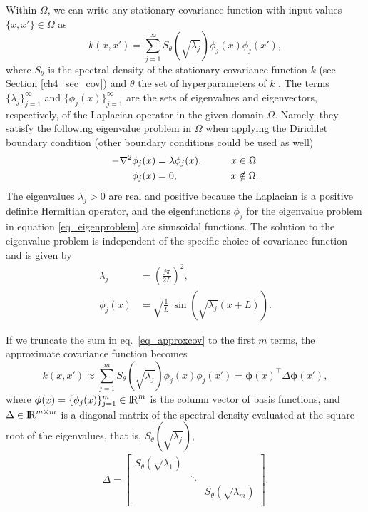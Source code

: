 \documentclass[onecolumn,a4paper,11pt]{article}
\begin{document}
Within $\Omega$, we can write any stationary covariance function with input values $\{x,x'\} \in \Omega$ as
%
\begin{equation}\label{eq_approxcov}
k(x,x') = \sum_{j=1}^\infty S_{\theta}(\sqrt{\lambda_j}) \phi_j(x) \phi_j(x'),
\end{equation} 
%
where $S_{\theta}$ is the spectral density of the stationary covariance function $k$ (see Section \ref{ch4_sec_cov}) and $\theta$ the set of hyperparameters of $k$ \citep{rasmussen2006gaussian}. The terms $\{\lambda_j\}_{j=1}^{\infty}$ and $\{\phi_j(x)\}_{j=1}^{\infty}$ are the sets of eigenvalues and eigenvectors, respectively, of the Laplacian operator in the given domain $\Omega$. Namely, they satisfy the following eigenvalue problem in $\Omega$ when applying the Dirichlet boundary condition (other boundary conditions could be used as well)
%
\begin{align}\label{eq_eigenproblem}
\begin{split}
-\nabla^2 \phi_j(x)&=\lambda \phi_j(x), \hspace{1cm}  x \in \Omega \\ 
\phi_j(x)&= 0, \hspace{1.85cm}   x \notin \Omega.
\end{split}
\end{align} 
%
The eigenvalues $\lambda_j>0$ are real and positive because the Laplacian is a positive definite Hermitian operator, and the eigenfunctions $\phi_j$ for the eigenvalue problem in equation \eqref{eq_eigenproblem} are sinusoidal functions. The solution to the eigenvalue problem is independent of  the specific choice of covariance function and is given by
%
\begin{align}
\lambda_j&=\left(\frac{j\pi}{2L}\right)^{\!2}, \label{eq_eigenvalue}\\
\phi_j(x)&=\sqrt{\frac{1}{L}}\, \sin\!\!\left(\sqrt{\lambda_j}(x+L)\right). \label{eq_eigenfunction}
\end{align}

If we truncate the sum in eq.~\eqref{eq_approxcov} to the first $m$ terms, the approximate covariance function becomes
%
\begin{equation}
k(x,x') \approx \sum_{j=1}^m S_{\theta}(\sqrt{\lambda_j}) \phi_j(x) \phi_j(x') = \bm{\phi}(x)^\intercal \Delta \bm{\phi}(x'), \nonumber
\end{equation}
%
where $\bm{\phi}(x)=\{\phi_j(x)\}_{j=1}^{m} \in {\rm I\!R}^{m}$ is the column vector of basis functions, and $\Delta  \in {\rm I\!R}^{m\times m}$ is a diagonal matrix of the spectral density evaluated at the square root of the eigenvalues, that is, $S_{\theta}(\sqrt{\lambda_j})$,
%
\begin{align}
\Delta =  \begin{bmatrix}
    S_{\theta}(\sqrt{\lambda_1}) & & \\
    & \ddots & \nonumber \\
    & & S_{\theta}(\sqrt{\lambda_m}) \\
  \end{bmatrix}.
\end{align}
\end{document}
